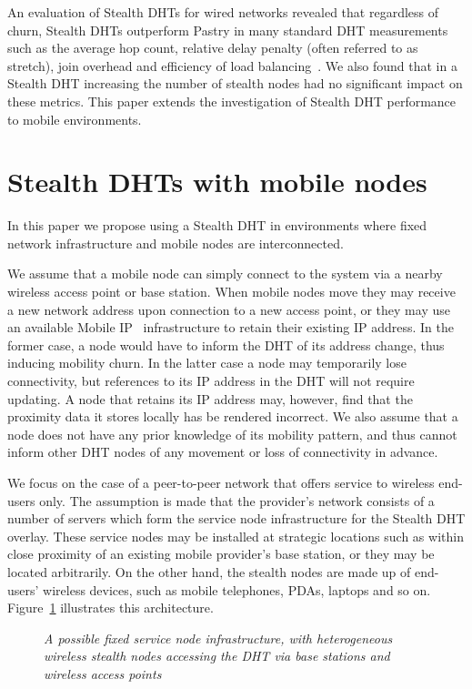 \documentclass[conference]{IEEEtran}
\begin{document}
An evaluation of Stealth DHTs for wired networks revealed that
regardless of churn, Stealth DHTs outperform Pastry in many standard
DHT measurements such as the average hop count, relative delay
penalty (often referred to as stretch), join overhead and efficiency
of load balancing~\cite{stealth1}. We also found that in a Stealth
DHT increasing the number of stealth nodes had no significant impact
on these metrics. This paper extends the investigation of Stealth
DHT performance to mobile environments.

\section{Stealth DHTs with mobile nodes}
\label{sect-mobile}

In this paper we propose using a Stealth DHT in environments where
fixed network infrastructure and mobile nodes are interconnected.

We assume that a mobile node can simply connect to the system via a
nearby wireless access point or base station. When mobile nodes move
they may receive a new network address upon connection to a new
access point, or they may use an available Mobile IP~\cite{rfc3344}
infrastructure to retain their existing IP address. In the former
case, a node would have to inform the DHT of its address change,
thus inducing mobility churn. In the latter case a node may
temporarily lose connectivity, but references to its IP address in
the DHT will not require updating. A node that retains its IP
address may, however, find that the proximity data it stores locally
has be rendered incorrect. We also assume that a node does not have
any prior knowledge of its mobility pattern, and thus cannot inform
other DHT nodes of any movement or loss of connectivity in advance.

We focus on the case of a peer-to-peer network that offers service
to wireless end-users only. The assumption is made that the
provider's network consists of a number of servers which form the
service node infrastructure for the Stealth DHT overlay. These
service nodes may be installed at strategic locations such as within
close proximity of an existing mobile provider's base station, or
they may be located arbitrarily. On the other hand, the stealth
nodes are made up of end-users' wireless devices, such as mobile
telephones, PDAs, laptops and so on. Figure~\ref{fig:mob}
illustrates this architecture.

\begin{figure}[htb]
\centering {}
\caption{\em A possible fixed service node infrastructure, with
heterogeneous wireless stealth nodes accessing the DHT via base
stations and wireless access points} \label{fig:mob}
\end{figure}
\end{document}
